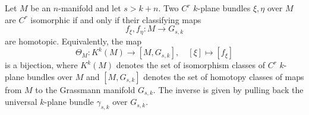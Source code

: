 Let $M$ be an $n$-manifold and let $s > k + n$. Two $C^r$ $k$-plane bundles $\xi, \eta$ over $M$ are $C^r$ isomorphic if and only if their classifying maps
$$f_\xi, f_\eta: M \to G_{s,k}$$
are homotopic. Equivalently, the map
$$\Theta_M: K^k(M) \to [M, G_{s,k}], \quad [\xi] \mapsto [f_\xi]$$
is a bijection, where $K^k(M)$ denotes the set of isomorphism classes of $C^r$ $k$-plane bundles over $M$ and $[M, G_{s,k}]$ denotes the set of homotopy classes of maps from $M$ to the Grassmann manifold $G_{s,k}$. The inverse is given by pulling back the universal $k$-plane bundle $\gamma_{s,k}$ over $G_{s,k}$.
